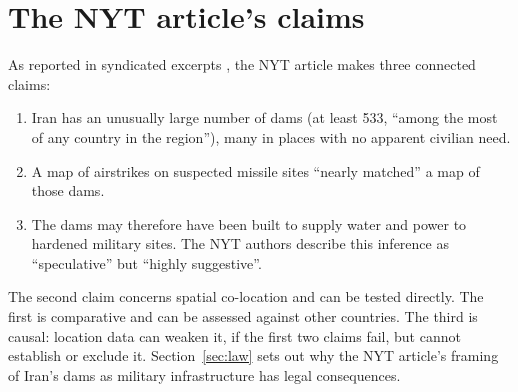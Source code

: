 \documentclass[numbered]{saim-blog}
\begin{document}
\section{The NYT article's claims}
As reported in syndicated excerpts \citep{nyt2026dams,moa2026}, the NYT article makes three connected claims:
\begin{enumerate}
\item Iran has an unusually large number of dams (at least 533, ``among the most of any country in the region''), many in places with no apparent civilian need.
\item A map of airstrikes on suspected missile sites ``nearly matched'' a map of those dams.
\item The dams may therefore have been built to supply water and power to hardened military sites. The NYT authors describe this inference as ``speculative'' but ``highly suggestive''.
\end{enumerate}
The second claim concerns spatial co-location and can be tested directly. The first is comparative and can be assessed against other countries. The third is causal: location data can weaken it, if the first two claims fail, but cannot establish or exclude it. Section~\ref{sec:law} sets out why the NYT article's framing of Iran's dams as military infrastructure has legal consequences.
\end{document}
